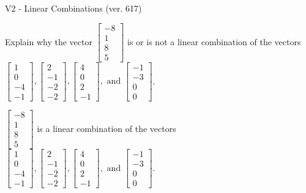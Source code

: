 \begin{exercise}
  \begin{exerciseTitle}V2 - Linear Combinations (ver. 617)\end{exerciseTitle}
  \begin{exerciseStatement}
    Explain why the vector \(\left[\begin{array}{c}
-8 \\
1 \\
8 \\
5
\end{array}\right]\)  is or is not a linear 
	combination of the vectors \(\left[\begin{array}{c}
1 \\
0 \\
-4 \\
-1
\end{array}\right] , \left[\begin{array}{c}
2 \\
-1 \\
-2 \\
-2
\end{array}\right] , \left[\begin{array}{c}
4 \\
0 \\
2 \\
-1
\end{array}\right] , \text{ and } \left[\begin{array}{c}
-1 \\
-3 \\
0 \\
0
\end{array}\right]\).
	


  \end{exerciseStatement}
  \begin{exerciseAnswer}
   \(\left[\begin{array}{c}
-8 \\
1 \\
8 \\
5
\end{array}\right]\) 
  	 is  
	a linear combination of the vectors \(\left[\begin{array}{c}
1 \\
0 \\
-4 \\
-1
\end{array}\right] , \left[\begin{array}{c}
2 \\
-1 \\
-2 \\
-2
\end{array}\right] , \left[\begin{array}{c}
4 \\
0 \\
2 \\
-1
\end{array}\right] , \text{ and } \left[\begin{array}{c}
-1 \\
-3 \\
0 \\
0
\end{array}\right]\).


\end{exerciseAnswer}
\end{exercise}
